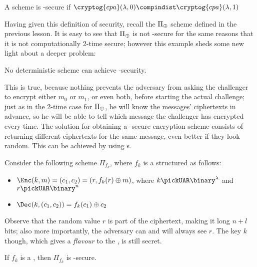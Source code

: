 \begin{definition}
    A scheme is \cpa-secure if $\cryptog{cpa}(\lambda, 0) \compindist \cryptog{cpa}(\lambda, 1)$
\end{definition}


Having given this definition of security, recall the $\Pi_\oplus$ scheme defined in the previous lesson. It is easy to see that $\Pi_\oplus$ is not \cpa-secure for the same reasons that it is not computationally 2-time secure; however this example sheds some new light about a deeper problem:

\begin{observation}
    No deterministic scheme can achieve \cpa-security.
\end{observation}

This is true, because nothing prevents the adversary from asking the challenger to encrypt either $m_0$ or $m_1$, or even both, before starting the actual challenge; just as in the 2-time case for $\Pi_\oplus$, he will know the messages' ciphertexts in advance, so he will be able to tell which message the challenger has encrypted every time. The solution for obtaining a \cpa-secure encryption scheme consists of returning different ciphertexts for the same message, even better if they look random. This can be achieved by using \prf{}s.

Consider the following \ske{} scheme $\Pi_{f_k}$, where $f_k$ is a \prf{} structured as follows:

\begin{itemize}
    \item $\Enc(k, m) = (c_1, c_2) = (r, f_k(r) \xor m)$, where $k \pickUAR \binary^\lambda$ and $r \pickUAR \binary^n$
    
    \item $\Dec(k, (c_1, c_2)) = f_k(c_1) \xor c_2$
\end{itemize}

Observe that the random value $r$ is part of the ciphertext, making it long $n+l$ bits; also more importantly, the adversary can and will always see $r$. The key $k$ though, which gives a \textit{flavour} to the \prf, is still secret.

\begin{theorem} \label{thm:prfcpa}
    If $f_k$ is a \prf, then $\Pi_{f_k}$ is \cpa-secure.
\end{theorem}

